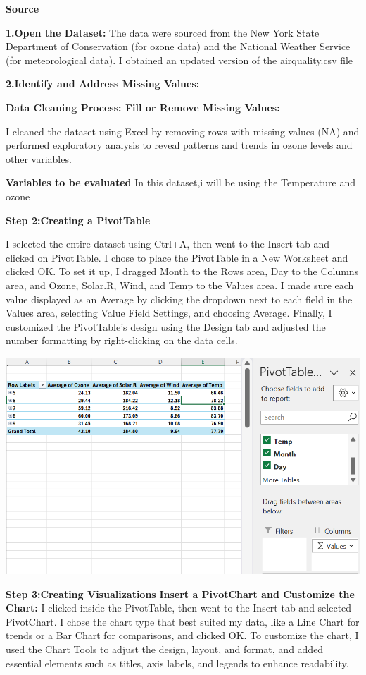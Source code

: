 \documentclass[
  letterpaper,
  DIV=11,
  numbers=noendperiod]{scrreprt}
\begin{document}
\textbf{Source}

\textbf{1.Open the Dataset:} The data were sourced from the New York
State Department of Conservation (for ozone data) and the National
Weather Service (for meteorological data). I obtained an updated version
of the airquality.csv file

\textbf{2.Identify and Address Missing Values:}

\textbf{Data Cleaning Process: Fill or Remove Missing Values:}

I cleaned the dataset using Excel by removing rows with missing values
(NA) and performed exploratory analysis to reveal patterns and trends in
ozone levels and other variables.

\textbf{Variables to be evaluated} In this dataset,i will be using the
Temperature and ozone

\textbf{Step 2:Creating a PivotTable}

I selected the entire dataset using Ctrl+A, then went to the Insert tab
and clicked on PivotTable. I chose to place the PivotTable in a New
Worksheet and clicked OK. To set it up, I dragged Month to the Rows
area, Day to the Columns area, and Ozone, Solar.R, Wind, and Temp to the
Values area. I made sure each value displayed as an Average by clicking
the dropdown next to each field in the Values area, selecting Value
Field Settings, and choosing Average. Finally, I customized the
PivotTable's design using the Design tab and adjusted the number
formatting by right-clicking on the data cells.

\includegraphics{PivotTable_Olufawo.png}

\textbf{Step 3:Creating Visualizations} \textbf{Insert a PivotChart and
Customize the Chart:} I clicked inside the PivotTable, then went to the
Insert tab and selected PivotChart. I chose the chart type that best
suited my data, like a Line Chart for trends or a Bar Chart for
comparisons, and clicked OK. To customize the chart, I used the Chart
Tools to adjust the design, layout, and format, and added essential
elements such as titles, axis labels, and legends to enhance
readability.
\end{document}
